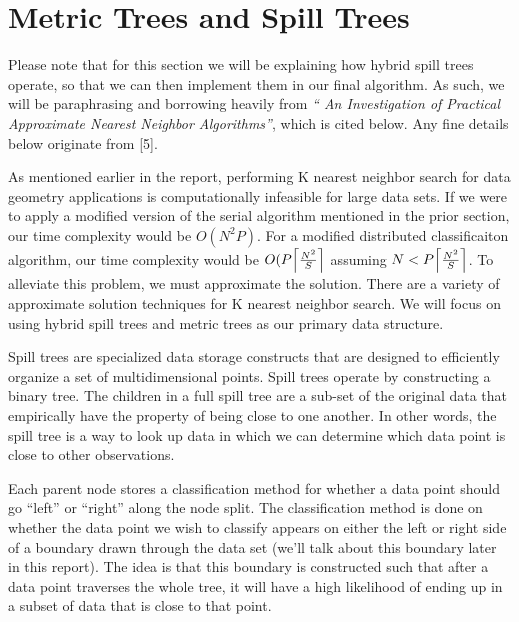 \section{Metric Trees and Spill Trees}

\vspace{5 mm}
\noindent
Please note that for this section we will be explaining how hybrid spill 
trees operate, so that we can then implement them in our final algorithm. 
As such, we will be paraphrasing and borrowing heavily from  \textit{``
An Investigation of Practical Approximate Nearest Neighbor Algorithms''},
which is cited below.  Any fine details below originate from [5].

\vspace{5 mm}
\noindent
As mentioned earlier in the report, performing K nearest neighbor search for 
data geometry applications is computationally infeasible for large data sets. 
If we were to apply a modified version of the serial algorithm mentioned in the 
prior section, our time complexity would be $O(N^{2} P)$. For a modified 
distributed classificaiton algorithm, our time complexity would be 
$O(P \ceil*{\frac{N^{2}}{S}}$ assuming $N < P \ceil*{\frac{N^{2}}{S}}$.
To alleviate this problem, we must approximate the solution. There are a 
variety of approximate solution techniques for K nearest neighbor search. We 
will focus on using hybrid spill trees and metric trees as our primary data 
structure.

\vspace{5 mm}
\noindent
Spill trees are specialized data storage constructs that are designed to 
efficiently organize a set of multidimensional points.  Spill trees operate by 
constructing a binary tree. The children in a full spill tree are a sub-set of 
the original data that empirically have the property of being close to one 
another. In other words, the spill tree is a way to look up data in which we 
can determine which data point is close to other observations.

\vspace{5 mm}
\noindent
Each parent node stores a classification method for whether a data point should 
go ``left'' or ``right'' along the node split. The classification method is 
done on whether the data point we wish to classify appears on either the left 
or right side of a boundary drawn through the data set (we'll talk about this 
boundary later in this report). The idea is that this boundary is constructed 
such that after a data point traverses the whole tree, it will have a high 
likelihood of ending up in a subset of data that is close to that point.

